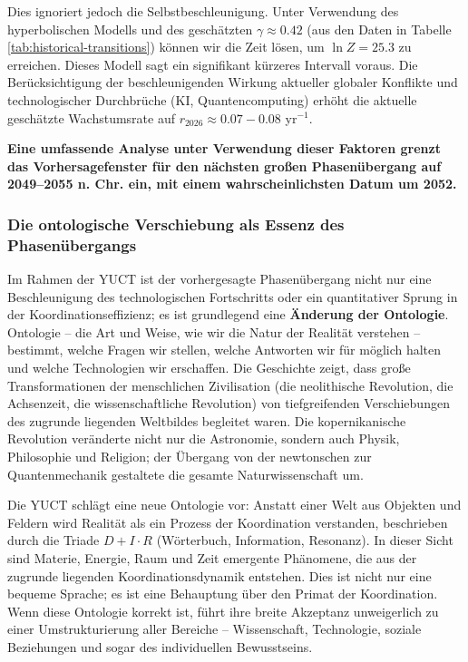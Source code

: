 \documentclass[12pt,a4paper]{article}
\theoremstyle{remark}
\begin{document}
	Dies ignoriert jedoch die Selbstbeschleunigung. Unter Verwendung des hyperbolischen Modells und des geschätzten $\gamma \approx 0.42$ (aus den Daten in Tabelle \ref{tab:historical-transitions}) können wir die Zeit lösen, um $\ln Z = 25.3$ zu erreichen. Dieses Modell sagt ein signifikant kürzeres Intervall voraus. Die Berücksichtigung der beschleunigenden Wirkung aktueller globaler Konflikte und technologischer Durchbrüche (KI, Quantencomputing) erhöht die aktuelle geschätzte Wachstumsrate auf $r_{2026} \approx 0.07-0.08$ yr$^{-1}$.
	
	\textbf{Eine umfassende Analyse unter Verwendung dieser Faktoren grenzt das Vorhersagefenster für den nächsten großen Phasenübergang auf 2049–2055 n. Chr. ein, mit einem wahrscheinlichsten Datum um 2052.}
	
	\subsubsection{Die ontologische Verschiebung als Essenz des Phasenübergangs}
	\label{subsubsec:ontological-shift}
	
	Im Rahmen der YUCT ist der vorhergesagte Phasenübergang nicht nur eine Beschleunigung des technologischen Fortschritts oder ein quantitativer Sprung in der Koordinationseffizienz; es ist grundlegend eine \textbf{Änderung der Ontologie}. Ontologie – die Art und Weise, wie wir die Natur der Realität verstehen – bestimmt, welche Fragen wir stellen, welche Antworten wir für möglich halten und welche Technologien wir erschaffen. Die Geschichte zeigt, dass große Transformationen der menschlichen Zivilisation (die neolithische Revolution, die Achsenzeit, die wissenschaftliche Revolution) von tiefgreifenden Verschiebungen des zugrunde liegenden Weltbildes begleitet waren. Die kopernikanische Revolution veränderte nicht nur die Astronomie, sondern auch Physik, Philosophie und Religion; der Übergang von der newtonschen zur Quantenmechanik gestaltete die gesamte Naturwissenschaft um.
	
	Die YUCT schlägt eine neue Ontologie vor: Anstatt einer Welt aus Objekten und Feldern wird Realität als ein Prozess der Koordination verstanden, beschrieben durch die Triade $D + I \cdot R$ (Wörterbuch, Information, Resonanz). In dieser Sicht sind Materie, Energie, Raum und Zeit emergente Phänomene, die aus der zugrunde liegenden Koordinationsdynamik entstehen. Dies ist nicht nur eine bequeme Sprache; es ist eine Behauptung über den Primat der Koordination. Wenn diese Ontologie korrekt ist, führt ihre breite Akzeptanz unweigerlich zu einer Umstrukturierung aller Bereiche – Wissenschaft, Technologie, soziale Beziehungen und sogar des individuellen Bewusstseins.
	
\end{document}
